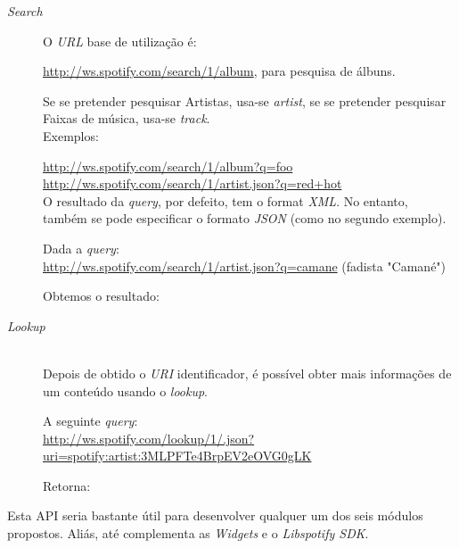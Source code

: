       \begin{description}
        \item[\emph{Search}] \hfill

          O \emph{URL} base de utilização é:

          \url{http://ws.spotify.com/search/1/album}, para pesquisa de álbuns.

          Se se pretender pesquisar Artistas, usa-se \emph{artist}, se se pretender pesquisar Faixas de música, usa-se \emph{track}. \\

          Exemplos:

          \url{http://ws.spotify.com/search/1/album?q=foo} \\
          \url{http://ws.spotify.com/search/1/artist.json?q=red+hot} \\

          O resultado da \emph{query}, por defeito, tem o format \emph{XML}. No entanto, também se pode especificar o formato \emph{JSON} (como no segundo exemplo).

          Dada a \emph{query}: \\
          \url{http://ws.spotify.com/search/1/artist.json?q=camane} (fadista "Camané")

          Obtemos o resultado:

          

        \item[\emph{Lookup}] \hfill \\
          Depois de obtido o \emph{URI} identificador, é possível obter mais informações de um conteúdo usando o \emph{lookup}.

          A seguinte \emph{query}: \\
          \url{http://ws.spotify.com/lookup/1/.json?uri=spotify:artist:3MLPFTe4BrpEV2eOVG0gLK}

          Retorna:

          

      \end{description}

      Esta API seria bastante útil para desenvolver qualquer um dos seis módulos propostos.
      Aliás, até complementa as \emph{Widgets} e o \emph{Libspotify SDK}.


